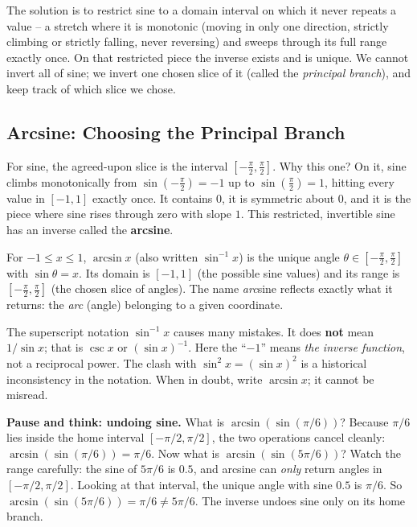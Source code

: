 \begin{intuitionbox}
The solution is to restrict sine to a domain interval on which it never repeats a value -- a stretch where it is monotonic (moving in only one direction, strictly climbing or strictly falling, never reversing) and sweeps through its full range exactly once. On that restricted piece the inverse exists and is unique. We cannot invert all of sine; we invert one chosen slice of it (called the \emph{principal branch}), and keep track of which slice we chose.
\end{intuitionbox}

\subsection{Arcsine: Choosing the Principal Branch}

For sine, the agreed-upon slice is the interval $[-\tfrac{\pi}{2}, \tfrac{\pi}{2}]$. Why this one? On it, sine climbs monotonically from $\sin(-\tfrac\pi2) = -1$ up to $\sin(\tfrac\pi2) = 1$, hitting every value in $[-1,1]$ exactly once. It contains $0$, it is symmetric about $0$, and it is the piece where sine rises through zero with slope $1$. This restricted, invertible sine has an inverse called the \textbf{arcsine}.

\begin{definition}[Arcsine]
\label{ch04:def-arcsin}
For $-1 \le x \le 1$, $\arcsin x$ (also written $\sin^{-1}x$) is the unique angle $\theta \in [-\tfrac{\pi}{2}, \tfrac{\pi}{2}]$ with $\sin\theta = x$. Its domain is $[-1,1]$ (the possible sine values) and its range is $[-\tfrac{\pi}{2}, \tfrac{\pi}{2}]$ (the chosen slice of angles). The name \emph{arc}sine reflects exactly what it returns: the \emph{arc} (angle) belonging to a given coordinate.
\end{definition}

\begin{trapbox}
The superscript notation $\sin^{-1}x$ causes many mistakes. It does \textbf{not} mean $1/\sin x$; that is $\csc x$ or $(\sin x)^{-1}$. Here the ``$-1$'' means \emph{the inverse function}, not a reciprocal power. The clash with $\sin^2 x = (\sin x)^2$ is a historical inconsistency in the notation. When in doubt, write $\arcsin x$; it cannot be misread.
\end{trapbox}

\begin{recoverybox}
\textbf{Pause and think: undoing sine.}
What is $\arcsin(\sin(\pi/6))$? Because $\pi/6$ lies inside the home interval $[-\pi/2, \pi/2]$, the two operations cancel cleanly: $\arcsin(\sin(\pi/6)) = \pi/6$. Now what is $\arcsin(\sin(5\pi/6))$? Watch the range carefully: the sine of $5\pi/6$ is $0.5$, and arcsine can \emph{only} return angles in $[-\pi/2, \pi/2]$. Looking at that interval, the unique angle with sine $0.5$ is $\pi/6$. So $\arcsin(\sin(5\pi/6)) = \pi/6 \neq 5\pi/6$. The inverse undoes sine only on its home branch.
\end{recoverybox}

